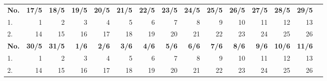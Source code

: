 \documentclass{article}
\begin{document}
\begin{table}[H]
    \centering
    \begin{tabularx}{\textwidth}{| X | r | r | r | r | r | r | r | r | r | r | r | r | r | r |}
        \Xhline{2pt}
        \textbf{No.} & \textbf{17/5} & \textbf{18/5} & \textbf{19/5} & \textbf{20/5} & \textbf{21/5} & \textbf{22/5} & \textbf{23/5} & \textbf{24/5} & \textbf{25/5} & \textbf{26/5} & \textbf{27/5} & \textbf{28/5} & \textbf{29/5} \\
        \Xhline{2pt}
        1. & 1 & 2 & 3 & 4 & 5 & 6 & 7 & 8 & 9 & 10 & 11 & 12 & 13 \\
        \hline
        2. & 14 & 15 & 16 & 17 & 18 & 19 & 20 & 21 & 22 & 23 & 24 & 25 & 26 \\
        \Xhline{2pt}
        \textbf{No.} & \textbf{30/5} & \textbf{31/5} & \textbf{ 1/6} & \textbf{ 2/6} & \textbf{ 3/6} & \textbf{ 4/6} & \textbf{ 5/6} & \textbf{ 6/6} & \textbf{ 7/6} & \textbf{ 8/6} & \textbf{ 9/6} & \textbf{10/6} & \textbf{11/6} \\
        \Xhline{2pt}
        1. & 1 & 2 & 3 & 4 & 5 & 6 & 7 & 8 & 9 & 10 & 11 & 12 & 13 \\
        \hline
        2. & 14 & 15 & 16 & 17 & 18 & 19 & 20 & 21 & 22 & 23 & 24 & 25 & 26 \\
        \hline
    \end{tabularx}
\end{table}
\vspace{0.5cm}
\end{document}
